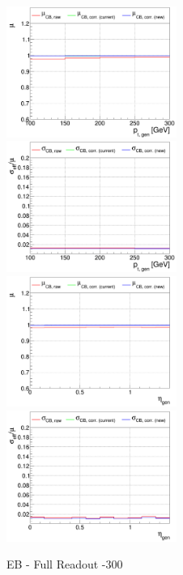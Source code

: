 \begin{figure}
\includegraphics[width=0.495\textwidth]{./plots_pdf/ECAL_plots/plotsPU/EB/FULL/pdf/GENPT/EBFULL_GENPT_0100_0300_MuOverBins.pdf}
\includegraphics[width=0.495\textwidth]{./plots_pdf/ECAL_plots/plotsPU/EB/FULL/pdf/GENPT/EBFULL_GENPT_0100_0300_EffSigmaOverBins.pdf}
\includegraphics[width=0.495\textwidth]{./plots_pdf/ECAL_plots/plotsPU/EB/FULL/pdf/GENETA/EBFULL_GENETA_0100_0300_MuOverBins.pdf}
\includegraphics[width=0.495\textwidth]{./plots_pdf/ECAL_plots/plotsPU/EB/FULL/pdf/GENETA/EBFULL_GENETA_0100_0300_EffSigmaOverBins.pdf}
\caption{EB - Full Readout -300\GeV}
\end{figure}




